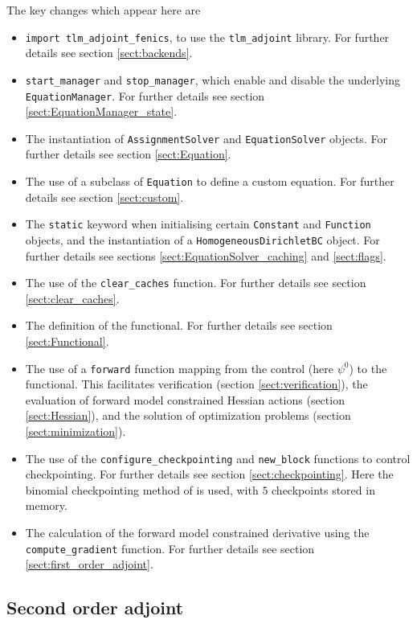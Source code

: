 \documentclass[11pt]{article}
\begin{document}
The key changes which appear here are
\begin{itemize}
  \item \texttt{import tlm\_adjoint\_fenics}, to use the \texttt{tlm\_adjoint}
    library. For further details see section \ref{sect:backends}.
  \item \texttt{start\_manager} and \texttt{stop\_manager}, which enable and
    disable the underlying \texttt{EquationManager}. For further details see
    section \ref{sect:EquationManager_state}.
  \item The instantiation of \texttt{AssignmentSolver} and
    \texttt{EquationSolver} objects. For further details see section
    \ref{sect:Equation}.
  \item The use of a subclass of \texttt{Equation} to define a custom equation.
    For further details see section \ref{sect:custom}.
  \item The \texttt{static} keyword when initialising certain \texttt{Constant}
    and \texttt{Function} objects, and the instantiation of a
    \texttt{HomogeneousDirichletBC} object. For further details see sections
    \ref{sect:EquationSolver_caching} and \ref{sect:flags}.
  \item The use of the \texttt{clear\_caches} function. For further details see
    section \ref{sect:clear_caches}.
  \item The definition of the functional. For further details see section
    \ref{sect:Functional}.
  \item The use of a \texttt{forward} function mapping from the control (here
    $\psi^0$) to the functional. This facilitates verification (section
    \ref{sect:verification}), the evaluation of forward model constrained
    Hessian actions (section \ref{sect:Hessian}), and the solution of
    optimization problems (section \ref{sect:minimization}).
  \item The use of the \texttt{configure\_checkpointing} and
    \texttt{new\_block} functions to control checkpointing. For further details
    see section \ref{sect:checkpointing}. Here the binomial checkpointing
    method of \citet{griewank2000} is used, with $5$ checkpoints stored in
    memory. 
  \item The calculation of the forward model constrained derivative using the
    \texttt{compute\_gradient} function. For further details see section
    \ref{sect:first_order_adjoint}.
\end{itemize}

\subsection{Second order adjoint}
\end{document}
